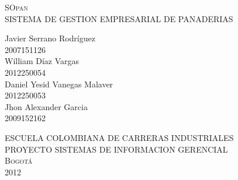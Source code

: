 \begin{titlepage}
\setlength{\parindent}{0pt} \setlength{\parskip}{0pt}

\begin{center}

\textsc{\large SOpan}\\[0.2cm]
{\large SISTEMA DE GESTION EMPRESARIAL DE PANADERIAS}\\[1cm]
\end{center}

\begin{center}

\end{center}

\begin{center}

\vfill
{\Large Javier Serrano Rodr\'iguez\\2007151126\\William D\'iaz Vargas\\2012250054\\Daniel Yesid Vanegas Malaver\\2012250053\\Jhon Alexander Garcia\\2009152162\\[0.4cm]}
\end{center}
\vfill
\begin{center}
\large \textsc{ESCUELA COLOMBIANA DE CARRERAS INDUSTRIALES\\PROYECTO SISTEMAS DE INFORMACION GERENCIAL\\Bogot\'a\\2012}
\end{center}
\end{titlepage}